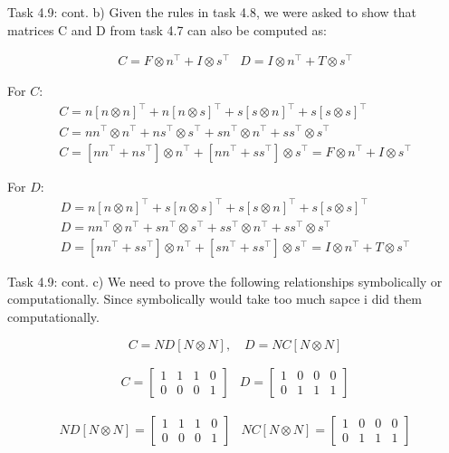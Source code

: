 \documentclass[aspectratio=169]{beamer}
\begin{document}
\begin{frame}[fragile]{Task 4.9: cont.}
b) Given the rules in task 4.8, we were asked to show that matrices C and D from task 4.7 can also be computed as:

\[
\begin{array}{ll}
C = F \otimes n^\top + I \otimes s^\top & D = I \otimes n^\top + T \otimes s^\top
\end{array}
\]

For \(C\):
\begin{align*}
   C = n[n \otimes n]^\top + n[n \otimes s]^\top + s[s \otimes n]^\top + s[s \otimes s]^\top \\
   C = nn^\top \otimes n^\top + ns^\top \otimes s^\top + sn^\top \otimes n^\top + ss^\top \otimes s^\top \\
   C = [nn^\top + ns^\top] \otimes n^\top + [nn^\top + ss^\top] \otimes s^\top = F \otimes n^\top + I \otimes s^\top
\end{align*}

For \(D\):
\begin{align*}
   D = n[n \otimes n]^\top + s[n \otimes s]^\top + s[s \otimes n]^\top + s[s \otimes s]^\top \\
   D = nn^\top \otimes n^\top + sn^\top \otimes s^\top + ss^\top \otimes n^\top + ss^\top \otimes s^\top \\
   D = [nn^\top + ss^\top] \otimes n^\top + [sn^\top + ss^\top] \otimes s^\top = I \otimes n^\top + T \otimes s^\top
\end{align*}
\end{frame}

\begin{frame}[fragile]{Task 4.9: cont.}
c) We need to prove the following relationships symbolically or computationally. Since symbolically would take too much sapce i did them computationally.

\[
C = ND [N \otimes N], \quad D = NC [N \otimes N]
\]

\[
\begin{array}{ll}
C = \begin{bmatrix}
1 & 1 & 1 & 0 \\
0 & 0 & 0 & 1
\end{bmatrix} &
D = \begin{bmatrix}
1 & 0 & 0 & 0 \\
0 & 1 & 1 & 1
\end{bmatrix}
\end{array}
\]

\[
\begin{array}{ll}
ND [N \otimes N] = \begin{bmatrix}
1 & 1 & 1 & 0 \\
0 & 0 & 0 & 1
\end{bmatrix} &
NC [N \otimes N] = \begin{bmatrix}
1 & 0 & 0 & 0 \\
0 & 1 & 1 & 1
\end{bmatrix}
\end{array}
\]
\end{frame}
\end{document}
